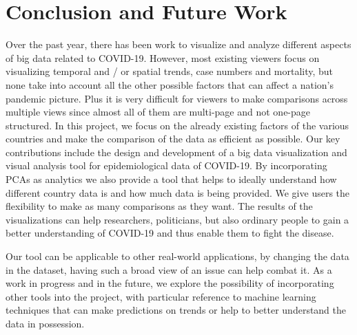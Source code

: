 \documentclass[10pt,conference]{IEEEtran}
\begin{document}
\section{Conclusion and Future Work}
Over the past year, there has been work to visualize and analyze different aspects of big data related to COVID-19. However, most existing viewers focus on visualizing temporal and / or spatial trends, case numbers and mortality, but none take into account all the other possible factors that can affect a nation's pandemic picture. Plus it is very difficult for viewers to make comparisons across multiple views since almost all of them are multi-page and not one-page structured. In this project, we focus on the already existing factors of the various countries and make the comparison of the data as efficient as possible. Our key contributions include the design and development of a big data visualization and visual analysis tool for epidemiological data of COVID-19. By incorporating PCAs as analytics we also provide a tool that helps to ideally understand how different country data is and how much data is being provided. We give users the flexibility to make as many comparisons as they want. The results of the visualizations can help researchers, politicians, but also ordinary people to gain a better understanding of COVID-19 and thus enable them to fight the disease.

Our tool can be applicable to other real-world applications, by changing the data in the dataset, having such a broad view of an issue can help combat it. As a work in progress and in the future, we explore the possibility of incorporating other tools into the project, with particular reference to machine learning techniques that can make predictions on trends or help to better understand the data in possession.
\end{document}
